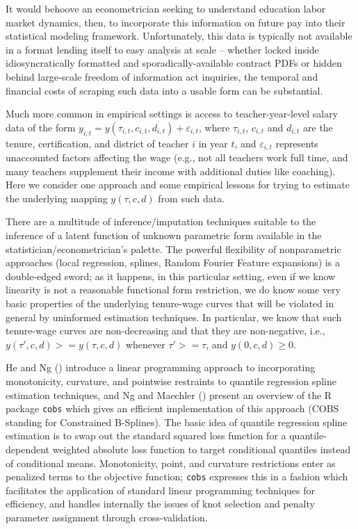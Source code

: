 It would behoove an econometrician seeking to understand education labor
market dynamics, then, to incorporate this information on future pay
into their statistical modeling framework. Unfortunately, this data is
typically not available in a format lending itself to easy analysis at
scale -- whether locked inside idiosyncratically formatted and
sporadically-available contract PDFs or hidden behind large-scale
freedom of information act inquiries, the temporal and financial costs
of scraping such data into a usable form can be substantial.

Much more common in empirical settings is access to teacher-year-level
salary data of the form
\(y_{i, t} = y(\tau_{i, t}, c_{i, t}, d_{i, t}) + \varepsilon_{i, t}\),
where \(\tau_{i,t}\), \(c_{i, t}\) and \(d_{i, t}\) are the tenure,
certification, and district of teacher \(i\) in year \(t\), and
\(\varepsilon_{i, t}\) represents unaccounted factors affecting the wage
(e.g., not all teachers work full time, and many teachers supplement
their income with additional duties like coaching). Here we consider one
approach and some empirical lessons for trying to estimate the
underlying mapping \(y(\tau, c, d)\) from such data.

There are a multitude of inference/imputation techniques suitable to the
inference of a latent function of unknown parametric form available in
the statistician/econometrician's palette. The powerful flexibility of
nonparametric approaches (local regression, splines, Random Fourier
Feature expansions) is a double-edged sword; as it happens, in this
particular setting, even if we know linearity is not a reasonable
functional form restriction, we do know some very basic properties of
the underlying tenure-wage curves that will be violated in general by
uninformed estimation techniques. In particular, we know that such
tenure-wage curves are non-decreasing and that they are non-negative,
i.e., \(y(\tau', c, d) >= y(\tau, c, d)\) whenever \(\tau' >= \tau\),
and \(y(0, c, d) \geq 0\).

He and Ng (\citeyear{he}) introduce a linear
programming approach to incorporating monotonicity, curvature, and
pointwise restraints to quantile regression spline estimation
techniques, and Ng and Maechler (\citeyear{ng})
present an overview of the R package \texttt{cobs} which gives an
efficient implementation of this approach (COBS standing for Constrained
B-Splines). The basic idea of quantile regression spline estimation is
to swap out the standard squared loss function for a quantile-dependent
weighted absolute loss function to target conditional quantiles instead
of conditional means. Monotonicity, point, and curvature restrictions
enter as penalized terms to the objective function; \texttt{cobs}
expresses this in a fashion which facilitates the application of
standard linear programming techniques for efficiency, and handles
internally the issues of knot selection and penalty parameter assignment
through cross-validation.

